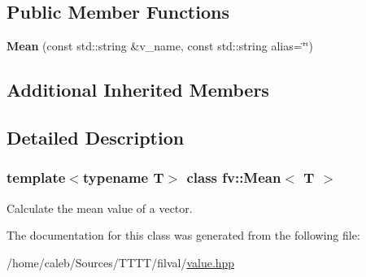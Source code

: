 \subsection*{Public Member Functions}
\begin{DoxyCompactItemize}
\item 
\hypertarget{classfv_1_1Mean_ad6c9af2854e3fd494d3fbac1eb742ff7}{}\label{classfv_1_1Mean_ad6c9af2854e3fd494d3fbac1eb742ff7} 
{\bfseries Mean} (const std\+::string \&v\+\_\+name, const std\+::string alias=\char`\"{}\char`\"{})
\end{DoxyCompactItemize}
\subsection*{Additional Inherited Members}


\subsection{Detailed Description}
\subsubsection*{template$<$typename T$>$\newline
class fv\+::\+Mean$<$ T $>$}

Calculate the mean value of a vector. 

The documentation for this class was generated from the following file\+:\begin{DoxyCompactItemize}
\item 
/home/caleb/\+Sources/\+T\+T\+T\+T/filval/\hyperlink{value_8hpp}{value.\+hpp}\end{DoxyCompactItemize}
